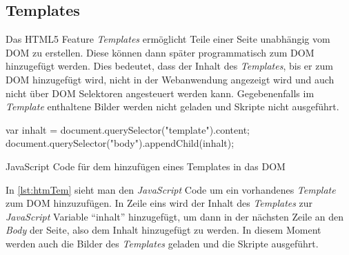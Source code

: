 \documentclass[12pt, paper=a4, bibtotoc, toc=listof]{scrreprt}
\begin{document}
			\subsection{Templates}
			\label{subsec:Templates}
			Das \ac{HTML5} Feature \emph{Templates} ermöglicht Teile einer Seite unabhängig vom \ac{DOM} zu erstellen. Diese können dann später programmatisch zum \ac{DOM} hinzugefügt werden. Dies bedeutet, dass der Inhalt des \emph{Templates}, bis er zum \ac{DOM} hinzugefügt wird, nicht in der Webanwendung angezeigt wird und auch nicht über \ac{DOM} Selektoren angesteuert werden kann. Gegebenenfalls im \emph{Template} enthaltene Bilder werden nicht geladen und Skripte nicht ausgeführt. 
					\begin{listing}
				\begin{JavaScriptcode*}{}
var inhalt = document.querySelector("template").content;
document.querySelector("body").appendChild(inhalt);
				\end{JavaScriptcode*}
				\caption{JavaScript Code für dem hinzufügen eines Templates in das DOM}
				\label{lst:htmTem}
			\end{listing}
			In \ref{lst:htmTem} sieht man den \emph{JavaScript} Code um ein vorhandenes \emph{Template} zum \ac{DOM} hinzuzufügen. In Zeile eins wird der Inhalt des \emph{Templates} zur \emph{JavaScript} Variable \enquote{inhalt} hinzugefügt, um dann in der nächsten Zeile an den \emph{Body} der Seite, also dem Inhalt hinzugefügt zu werden. In diesem Moment werden auch die Bilder des \emph{Templates} geladen und die Skripte ausgeführt.
\end{document}

